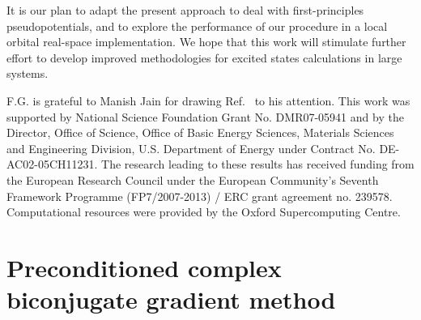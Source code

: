 \documentclass[twocolumn,prb,showpacs,superscriptaddress]{revtex4}
\begin{document}
It is our plan to adapt the present approach to deal with first-principles
pseudopotentials, and to explore the performance of our procedure in a local
orbital real-space implementation. We hope that this work will stimulate further effort
to develop improved methodologies for excited states calculations in large systems.

\begin{acknowledgments}
F.G. is grateful to Manish Jain for drawing Ref.\  to his attention.
This work was supported by National Science Foundation Grant No. DMR07-05941 and by the Director, 
Office of Science, Office of Basic Energy Sciences, 
Materials Sciences and Engineering Division, 
U.S. Department of Energy under Contract No. DE-AC02-05CH11231. 
The research leading to these results has received funding from the European Research
Council under the European Community's Seventh Framework Programme (FP7/2007-2013) / ERC 
grant agreement no. 239578.
Computational resources were provided by the Oxford Supercomputing Centre.
\end{acknowledgments}

\appendix

\section{Preconditioned complex biconjugate gradient method}\label{app.cbcg}
\end{document}
